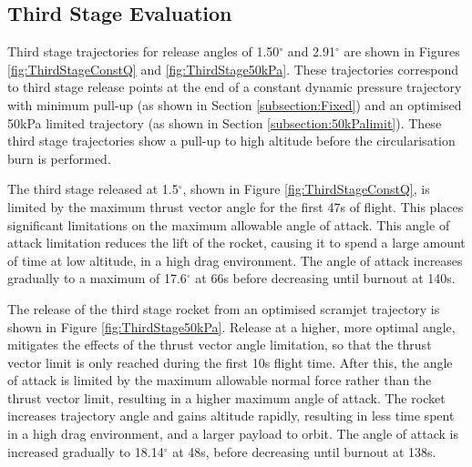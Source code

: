 \documentclass[journal]{new-aiaa}
\newcommand{\SeparationAngleConstq}{1.50}
\newcommand{\SeparationAngleFiftykPa}{2.91}
\begin{document}
 
\subsection{Third Stage Evaluation}

Third stage trajectories for release angles of \SeparationAngleConstq $^\circ$ and \SeparationAngleFiftykPa $^\circ$ are shown in Figures \ref{fig:ThirdStageConstQ} and \ref{fig:ThirdStage50kPa}. 
These trajectories correspond to third stage release points at the end of a constant dynamic pressure trajectory with minimum pull-up (as shown in Section \ref{subsection:Fixed}) and an optimised 50kPa limited trajectory  (as shown in Section \ref{subsection:50kPalimit}). 
These third stage trajectories show a pull-up to high altitude before the circularisation burn is performed. 

The third stage released at 1.5$^\circ$, shown in Figure \ref{fig:ThirdStageConstQ}, is limited by the maximum thrust vector angle for the first 47s of flight. This places significant limitations on the maximum allowable angle of attack. This angle of attack limitation reduces the lift of the rocket, causing it to spend a large amount of time at low altitude, in a high drag environment. The angle of attack increases gradually to a maximum of 17.6$^\circ$ at 66s before decreasing until burnout at 140s. 

The release of the third stage rocket from an optimised scramjet trajectory is shown in Figure \ref{fig:ThirdStage50kPa}. Release at a higher, more optimal angle, mitigates the effects of the thrust vector angle limitation, so that the thrust vector limit is only reached during the first 10s flight time. After this, the angle of attack is limited by the maximum allowable normal force rather than the thrust vector limit, resulting in a higher maximum angle of attack. The rocket increases trajectory angle and gains altitude rapidly, resulting in less time spent in a high drag environment, and a larger payload to orbit.  The angle of attack is increased gradually to 18.14$^\circ$ at 48s, before decreasing until burnout at 138s.
\end{document}
